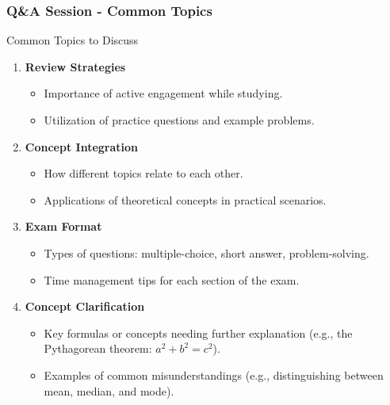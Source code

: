 \documentclass{beamer}
\begin{document}
\begin{frame}[fragile]
    \frametitle{Q\&A Session - Common Topics}
    \begin{block}{Common Topics to Discuss}
        \begin{enumerate}
            \item \textbf{Review Strategies}
                \begin{itemize}
                    \item Importance of active engagement while studying.
                    \item Utilization of practice questions and example problems.
                \end{itemize}
                
            \item \textbf{Concept Integration}
                \begin{itemize}
                    \item How different topics relate to each other.
                    \item Applications of theoretical concepts in practical scenarios.
                \end{itemize}

            \item \textbf{Exam Format}
                \begin{itemize}
                    \item Types of questions: multiple-choice, short answer, problem-solving.
                    \item Time management tips for each section of the exam.
                \end{itemize}

            \item \textbf{Concept Clarification}
                \begin{itemize}
                    \item Key formulas or concepts needing further explanation (e.g., the Pythagorean theorem: \( a^2 + b^2 = c^2 \)).
                    \item Examples of common misunderstandings (e.g., distinguishing between mean, median, and mode).
                \end{itemize}
        \end{enumerate}
    \end{block}
\end{frame}
\end{document}
